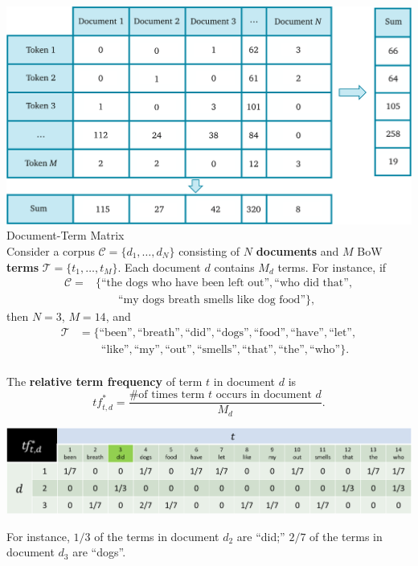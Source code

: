 \documentclass[20pt,landscape,footrule,headrule]{foils}
\newcommand{\newl}{\newline\newline}
\begin{document}
{{\newpage\ \includegraphics[width=\textwidth]{Images/DTM} \\ Document-Term Matrix\newpage\ \\ \noindent Consider a corpus $\mathcal{C}=\{d_1,\ldots,d_N\}$ consisting of $N$ \textbf{documents} and $M$ BoW \textbf{terms} $\mathcal{T}=\{t_1,\ldots,t_M\}$. Each document $d$ contains $M_d$ terms. \newl For instance, if \begin{align*}\mathcal{C} =& \{\text{``the dogs who have been left out''}, \text{``who did that''},  \\ & \qquad \text{``my dogs breath smells like dog food''}\}, \end{align*}
then $N=3$, $M=14$, and \begin{align*}\mathcal{T}&=\{\text{``been''},\text{``breath''},\text{``did''},\text{``dogs''},\text{``food''},\text{``have''},\text{``let''},\\ & \qquad\text{``like''},\text{``my''},  \text{``out''},\text{``smells''},\text{``that''},\text{``the''},\text{``who''}\}.\end{align*}\newpage\ \\ \noindent The \textbf{relative term frequency} of term $t$ in document $d$ is $$\textit{tf}^*_{t,d}=\frac{\text{\# of times term $t$ occurs in document $d$}}{M_d}.$$
\begin{center}\includegraphics[width=\textwidth]{Images/tf}
\end{center}
For instance, $1/3$ of the terms in document $d_2$ are ``did;'' $2/7$ of the terms in document $d_3$ are ``dogs''.  
}}
\end{document}
